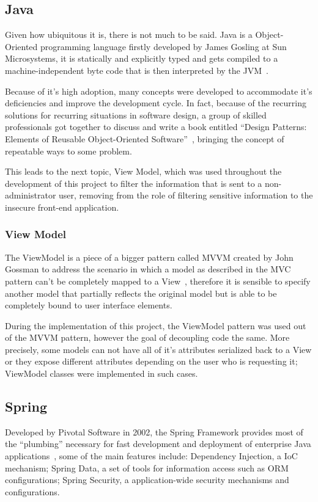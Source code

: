 \subsection{Java}
Given how ubiquitous it is, there is not much to be said. Java is a Object-Oriented programming language firstly developed by James Gosling at Sun Microsystems, it is statically and explicitly typed and gets compiled to a machine-independent byte code that is then interpreted by the \gls{JVM}~\cite{java}.

Because of it's high adoption, many concepts were developed to accommodate it's deficiencies and improve the development cycle. In fact, because of the recurring solutions for recurring situations in software design, a group of skilled professionals got together to discuss and write a book entitled ``Design Patterns: Elements of Reusable Object-Oriented Software''~\cite{patterns}, bringing the concept of repeatable ways to some problem.

This leads to the next topic, View Model, which was used throughout the development of this project to filter the information that is sent to a non-administrator user, removing from the role of filtering sensitive information to the insecure front-end application.

\subsubsection{View Model}
The ViewModel is a piece of a bigger pattern called \gls{MVVM} created by John Gossman to address the scenario in which a model as described in the \gls{MVC} pattern can't be completely mapped to a View~\cite{viewmodel}, therefore it is sensible to specify another model that partially reflects the original model but is able to be completely bound to user interface elements.

During the implementation of this project, the ViewModel pattern was used out of the \gls{MVVM} pattern, however the goal of decoupling code the same. More precisely, some models can not have all of it's attributes serialized back to a View or they expose different attributes depending on the user who is requesting it; ViewModel classes were implemented in such cases.

\subsection{Spring}
Developed by Pivotal Software in 2002, the Spring Framework provides most of the ``plumbing'' necessary for fast development and deployment of enterprise Java applications~\cite{springdocs}, some of the main features include: Dependency Injection, a \gls{IoC} mechanism; Spring Data, a set of tools for information access such as \gls{ORM} configurations; Spring Security, a application-wide security mechanisms and configurations.

